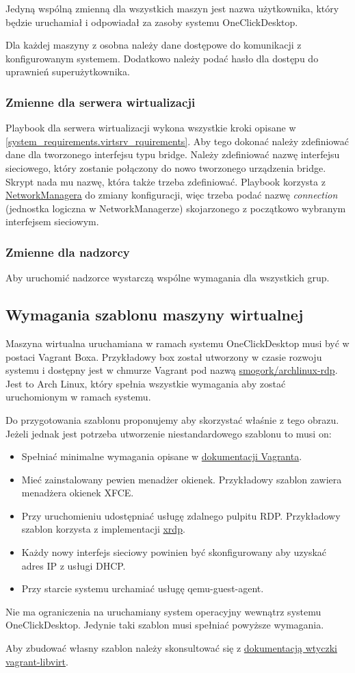 \documentclass[../opis-rozwiazania.tex]{subfiles}
\begin{document}
Jedyną wspólną zmienną dla wszystkich maszyn jest nazwa użytkownika, który będzie uruchamiał i odpowiadał za zasoby systemu OneClickDesktop.

Dla każdej maszyny z osobna należy dane dostępowe do komunikacji z konfigurowanym systemem. Dodatkowo należy podać hasło dla dostępu do uprawnień superużytkownika.

\subsubsection{Zmienne dla serwera wirtualizacji}
Playbook dla serwera wirtualizacji wykona wszystkie kroki opisane w \ref{system_requirements.virtsrv_rquirements}.
Aby tego dokonać należy zdefiniować dane dla tworzonego interfejsu typu bridge.
Należy zdefiniować nazwę interfejsu sieciowego, który zostanie połączony do nowo tworzonego urządzenia bridge.
Skrypt nada mu nazwę, która także trzeba zdefiniować.
Playbook korzysta z \href{https://networkmanager.dev/}{NetworkManagera} do zmiany konfiguracji, więc trzeba podać nazwę \textit{connection} (jednostka logiczna w NetworkManagerze) skojarzonego z początkowo wybranym interfejsem sieciowym.

\subsubsection{Zmienne dla nadzorcy}
Aby uruchomić nadzorce wystarczą wspólne wymagania dla wszystkich grup.

\subsection{Wymagania szablonu maszyny wirtualnej}
\label{system_requirements.vagrant_box}
Maszyna wirtualna uruchamiana w ramach systemu OneClickDesktop musi być w postaci Vagrant Boxa.
Przykładowy box został utworzony w czasie rozwoju systemu i dostępny jest w chmurze Vagrant pod nazwą \href{https://app.vagrantup.com/smogork/boxes/archlinux-rdp}{smogork/archlinux-rdp}.
Jest to Arch Linux, który spełnia wszystkie wymagania aby zostać uruchomionym w ramach systemu.

Do przygotowania szablonu proponujemy aby skorzystać właśnie z tego obrazu.
Jeżeli jednak jest potrzeba utworzenie niestandardowego szablonu to musi on:
\begin{itemize}
	\item Spełniać minimalne wymagania opisane w \href{https://www.vagrantup.com/docs/boxes/base}{dokumentacji Vagranta}.
	\item Mieć zainstalowany pewien menadżer okienek. Przykładowy szablon zawiera menadżera okienek XFCE.
	\item Przy uruchomieniu udostępniać usługę zdalnego pulpitu RDP. Przykładowy szablon korzysta z implementacji \href{http://xrdp.org/}{xrdp}.
	\item Każdy nowy interfejs sieciowy powinien być skonfigurowany aby uzyskać adres IP z usługi DHCP.
	\item Przy starcie systemu urchamiać usługę qemu-guest-agent.
\end{itemize}
Nie ma ograniczenia na uruchamiany system operacyjny wewnątrz systemu OneClickDesktop. Jedynie taki szablon musi spełniać powyższe wymagania.

Aby zbudować własny szablon należy skonsultować się z \href{https://github.com/vagrant-libvirt/vagrant-libvirt#create-box}{dokumentacją wtyczki vagrant-libvirt}.
	
\end{document}
